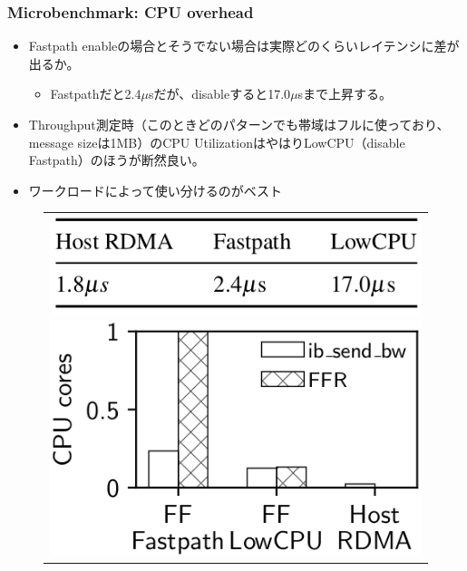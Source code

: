 \documentclass[dvipdfmx,9pt,notheorems]{beamer}
\theoremstyle{definition}
\begin{document}
\begin{frame}\frametitle{Microbenchmark: CPU overhead}
	\begin{itemize}
		\item Fastpath enableの場合とそうでない場合は実際どのくらいレイテンシに差が出るか。
		\begin{itemize}
			\item Fastpathだと2.4$\mu$sだが、disableすると17.0$\mu$sまで上昇する。
		\end{itemize}
	\item Throughput測定時（このときどのパターンでも帯域はフルに使っており、message sizeは1MB）のCPU UtilizationはやはりLowCPU（disable Fastpath）のほうが断然良い。
	\item {\color{orange}ワークロードによって使い分けるのがベスト}
  \end{itemize}
  \begin{figure}[htb]
  	\centering
		\begin{tabular}{c}
			\begin{minipage}{0.4\hsize}
  			\includegraphics[scale=1]{fig/table3.png}
  		\end{minipage}
			\begin{minipage}{0.4\hsize}
  			\centering
  			\includegraphics[scale=1]{fig/figure12.png}
  		\end{minipage}
		\end{tabular}
  \end{figure}
\end{frame}
\end{document}
